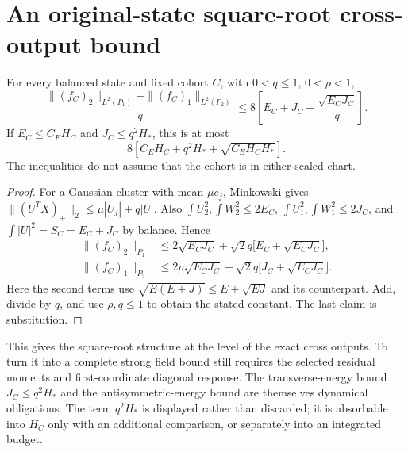 \documentclass[11pt]{article}
\numberwithin{equation}{section}
\theoremstyle{remark}\newtheorem{remark}[theorem]{Remark}
\begin{document}
\section{An original-state square-root cross-output bound}
\begin{proposition}\label{inc:AN03:clock:v1:crossenergy}
For every balanced state and fixed cohort $C$, with $0<q\le1$, $0<\rho<1$,
\begin{equation}\label{inc:AN03:clock:v1:crossbound}
 \frac{\|(f_C)_2\|_{L^2(P_1)}+\|(f_C)_1\|_{L^2(P_2)}}q
 \le8\left[E_C+J_C+\frac{\sqrt{E_CJ_C}}q\right].
\end{equation}
If $E_C\le C_EH_C$ and $J_C\le q^2H_*$, this is at most
\[
 8\left[C_EH_C+q^2H_*+\sqrt{C_EH_CH_*}\right].
\]
The inequalities do not assume that the cohort is in either scaled chart.
\end{proposition}
\begin{proof}
For a Gaussian cluster with mean $\mu e_j$, Minkowski gives
$\|(U^TX)_+\|_2\le\mu|U_j|+q|U|$.
Also $\int U_2^2,\int W_2^2\le2E_C$, $\int U_1^2,\int W_1^2\le2J_C$, and $\int|U|^2=S_C=E_C+J_C$ by balance. Hence
\begin{align*}
 \|(f_C)_2\|_{P_1}&\le2\sqrt{E_CJ_C}
        +\sqrt2q\big[E_C+\sqrt{E_CJ_C}\big],\\
 \|(f_C)_1\|_{P_2}&\le2\rho\sqrt{E_CJ_C}
        +\sqrt2q\big[J_C+\sqrt{E_CJ_C}\big].
\end{align*}
Here the second terms use $\sqrt{E(E+J)}\le E+\sqrt{EJ}$ and its counterpart. Add, divide by $q$, and use $\rho,q\le1$ to obtain the stated constant. The last claim is substitution.
\end{proof}
\noindent This gives the square-root structure at the level of the exact cross outputs. To turn it into a complete strong field bound still requires the selected residual moments and first-coordinate diagonal response. The transverse-energy bound $J_C\le q^2H_*$ and the antisymmetric-energy bound are themselves dynamical obligations. The term $q^2H_*$ is displayed rather than discarded; it is absorbable into $H_C$ only with an additional comparison, or separately into an integrated budget.
\end{document}
